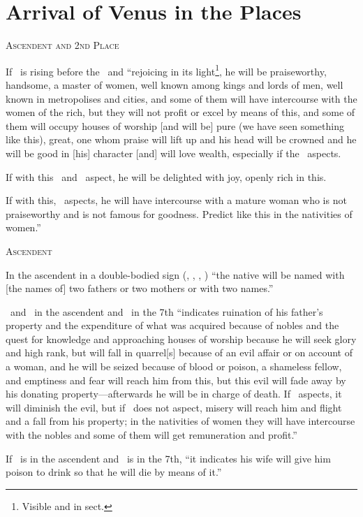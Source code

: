 \section{Arrival of Venus in the Places}
\noindent\textsc{Ascendent and 2nd Place}

If \Venus\, is rising before the \Sun\, and ``rejoicing in its light\footnote{Visible and in sect.}, he will be praiseworthy, handsome, a master of women, well known among kings and lords of men, well known in metropolises and cities, and some of them will have intercourse with the women of the rich, but they will not profit or excel by means of this, and some of them will occupy houses of worship [and will be] pure (we have seen something like this), great, one whom praise will lift up and his head will be crowned and he will be good in [his] character [and] will love wealth, especially if the \Moon\, aspects.

If with this \Mars\, and \Mercury\, aspect, he will be delighted with joy, openly rich in this. 

If with this, \Saturn\, aspects, he will have intercourse with a mature woman who is not praiseworthy and is not famous for goodness. Predict like this in the nativities of women.''

\noindent\textsc{Ascendent}

In the ascendent in a double-bodied sign (\Gemini, \Virgo, \Sagittarius, \Pisces) ``the native will be named with [the names of] two fathers or two mothers or with two names.''

\Venus\, and \Mercury\, in the ascendent and \Mars\, in the 7th ``indicates ruination of his father's property and the expenditure of what was acquired because of nobles and the quest for knowledge and approaching houses of worship because he will seek glory and high rank, but will fall in quarrel[s] because of an evil affair or on account of a woman, and he will be seized because of blood or poison, a shameless fellow, and emptiness and fear will reach him from this, but this evil will fade away by his donating property---afterwards he will be in charge of death. If \Jupiter\,  aspects, it will diminish the evil, but if \Jupiter\, does not aspect, misery will reach him and flight and a fall from his property; in the nativities of women they will have intercourse with the nobles and some of them will get remuneration and profit.''

If \Venus\, is in the ascendent and \Saturn\, is in the 7th, ``it indicates his wife will give him poison to drink so that he will die by means of it.''

